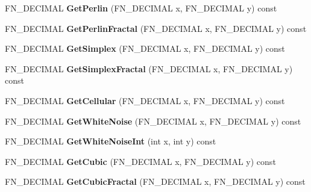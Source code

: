 \begin{DoxyCompactItemize}
\item 
\mbox{\label{classFastNoise_aa511d58e188f47cf4fd7fa83164e7a0b}} 
F\+N\+\_\+\+D\+E\+C\+I\+M\+AL {\bfseries Get\+Perlin} (F\+N\+\_\+\+D\+E\+C\+I\+M\+AL x, F\+N\+\_\+\+D\+E\+C\+I\+M\+AL y) const
\item 
\mbox{\label{classFastNoise_adc266f882b7128f39770bc79eae6b872}} 
F\+N\+\_\+\+D\+E\+C\+I\+M\+AL {\bfseries Get\+Perlin\+Fractal} (F\+N\+\_\+\+D\+E\+C\+I\+M\+AL x, F\+N\+\_\+\+D\+E\+C\+I\+M\+AL y) const
\item 
\mbox{\label{classFastNoise_a465c9c71c7a2b9f1e8093d85a6c0de4a}} 
F\+N\+\_\+\+D\+E\+C\+I\+M\+AL {\bfseries Get\+Simplex} (F\+N\+\_\+\+D\+E\+C\+I\+M\+AL x, F\+N\+\_\+\+D\+E\+C\+I\+M\+AL y) const
\item 
\mbox{\label{classFastNoise_a7b839d08e67cfa821b4c1094c9d50e95}} 
F\+N\+\_\+\+D\+E\+C\+I\+M\+AL {\bfseries Get\+Simplex\+Fractal} (F\+N\+\_\+\+D\+E\+C\+I\+M\+AL x, F\+N\+\_\+\+D\+E\+C\+I\+M\+AL y) const
\item 
\mbox{\label{classFastNoise_a5b0d04d4e200adb8865f7bbd41bcc04a}} 
F\+N\+\_\+\+D\+E\+C\+I\+M\+AL {\bfseries Get\+Cellular} (F\+N\+\_\+\+D\+E\+C\+I\+M\+AL x, F\+N\+\_\+\+D\+E\+C\+I\+M\+AL y) const
\item 
\mbox{\label{classFastNoise_aaf5a3c39b9e95d064690711852fb7fbf}} 
F\+N\+\_\+\+D\+E\+C\+I\+M\+AL {\bfseries Get\+White\+Noise} (F\+N\+\_\+\+D\+E\+C\+I\+M\+AL x, F\+N\+\_\+\+D\+E\+C\+I\+M\+AL y) const
\item 
\mbox{\label{classFastNoise_a7a9d98438239800363188c7219bb26bc}} 
F\+N\+\_\+\+D\+E\+C\+I\+M\+AL {\bfseries Get\+White\+Noise\+Int} (int x, int y) const
\item 
\mbox{\label{classFastNoise_a6ac3a7389bfb70b0d34aa80cc7d7db0f}} 
F\+N\+\_\+\+D\+E\+C\+I\+M\+AL {\bfseries Get\+Cubic} (F\+N\+\_\+\+D\+E\+C\+I\+M\+AL x, F\+N\+\_\+\+D\+E\+C\+I\+M\+AL y) const
\item 
\mbox{\label{classFastNoise_ae0ecd8c5e0bce59f68e11ad885f4284a}} 
F\+N\+\_\+\+D\+E\+C\+I\+M\+AL {\bfseries Get\+Cubic\+Fractal} (F\+N\+\_\+\+D\+E\+C\+I\+M\+AL x, F\+N\+\_\+\+D\+E\+C\+I\+M\+AL y) const

\end{DoxyCompactItemize}
